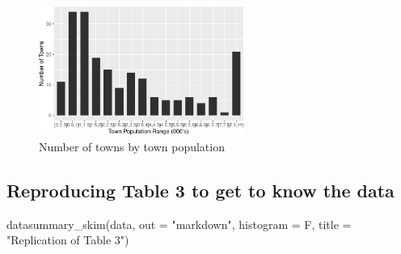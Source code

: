 \documentclass[
  a4paper,
  DIV=11,
  numbers=noendperiod]{scrartcl}
\newenvironment{Shaded}{\begin{snugshade}}{\end{snugshade}}
\newcommand{\AttributeTok}[1]{\textcolor[rgb]{0.40,0.45,0.13}{#1}}
\newcommand{\FunctionTok}[1]{\textcolor[rgb]{0.28,0.35,0.67}{#1}}
\newcommand{\NormalTok}[1]{\textcolor[rgb]{0.00,0.23,0.31}{#1}}
\newcommand{\StringTok}[1]{\textcolor[rgb]{0.13,0.47,0.30}{#1}}
\begin{document}
\begin{figure}[H]

{\centering \includegraphics[width=0.6\textwidth,height=\textheight]{IO2_PS2_Estrada_files/figure-pdf/figure2-1.pdf}

}

\caption{Number of towns by town population}

\end{figure}%

\subsection{Reproducing Table 3 to get to know the
data}\label{reproducing-table-3-to-get-to-know-the-data}

\begin{Shaded}
\begin{Highlighting}[numbers=left,,]
\FunctionTok{datasummary\_skim}\NormalTok{(data, }\AttributeTok{out =} \StringTok{"markdown"}\NormalTok{, }\AttributeTok{histogram =}\NormalTok{ F, }\AttributeTok{title =} \StringTok{"Replication of Table 3"}\NormalTok{)}
\end{Highlighting}
\end{Shaded}
\end{document}
